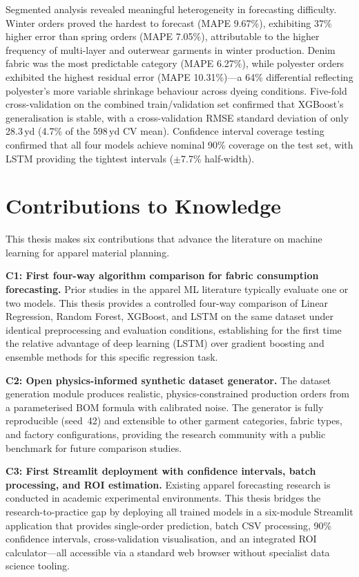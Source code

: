 Segmented analysis revealed meaningful heterogeneity in forecasting difficulty. Winter orders proved the hardest to forecast (MAPE 9.67\%), exhibiting 37\% higher error than spring orders (MAPE 7.05\%), attributable to the higher frequency of multi-layer and outerwear garments in winter production. Denim fabric was the most predictable category (MAPE 6.27\%), while polyester orders exhibited the highest residual error (MAPE 10.31\%)---a 64\% differential reflecting polyester's more variable shrinkage behaviour across dyeing conditions. Five-fold cross-validation on the combined train/validation set confirmed that XGBoost's generalisation is stable, with a cross-validation RMSE standard deviation of only 28.3\,yd (4.7\% of the 598\,yd CV mean). Confidence interval coverage testing confirmed that all four models achieve nominal 90\% coverage on the test set, with LSTM providing the tightest intervals ($\pm$7.7\% half-width).

\secdiv
\section{Contributions to Knowledge}
This thesis makes six contributions that advance the literature on machine learning for apparel material planning.

\textbf{C1: First four-way algorithm comparison for fabric consumption forecasting.} Prior studies in the apparel ML literature typically evaluate one or two models. This thesis provides a controlled four-way comparison of Linear Regression, Random Forest, XGBoost, and LSTM on the same dataset under identical preprocessing and evaluation conditions, establishing for the first time the relative advantage of deep learning (LSTM) over gradient boosting and ensemble methods for this specific regression task.

\textbf{C2: Open physics-informed synthetic dataset generator.} The dataset generation module produces realistic, physics-constrained production orders from a parameterised BOM formula with calibrated noise. The generator is fully reproducible (seed~42) and extensible to other garment categories, fabric types, and factory configurations, providing the research community with a public benchmark for future comparison studies.

\textbf{C3: First Streamlit deployment with confidence intervals, batch processing, and ROI estimation.} Existing apparel forecasting research is conducted in academic experimental environments. This thesis bridges the research-to-practice gap by deploying all trained models in a six-module Streamlit application that provides single-order prediction, batch CSV processing, 90\% confidence intervals, cross-validation visualisation, and an integrated ROI calculator---all accessible via a standard web browser without specialist data science tooling.

